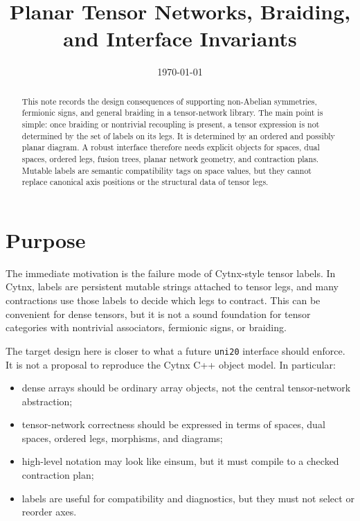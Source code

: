\documentclass[11pt]{article}
\title{Planar Tensor Networks, Braiding, and Interface Invariants}
\author{}
\date{\today}
\begin{document}
\maketitle

\begin{abstract}
This note records the design consequences of supporting non-Abelian
symmetries, fermionic signs, and general braiding in a tensor-network
library.  The main point is simple: once braiding or nontrivial
recoupling is present, a tensor expression is not determined by the
set of labels on its legs.  It is determined by an ordered and
possibly planar diagram.  A robust interface therefore needs explicit
objects for spaces, dual spaces, ordered legs, fusion trees, planar
network geometry, and contraction plans.  Mutable labels are semantic
compatibility tags on space values, but they cannot replace canonical
axis positions or the structural data of tensor legs.
\end{abstract}

\tableofcontents

\section{Purpose}

The immediate motivation is the failure mode of Cytnx-style tensor
labels.  In Cytnx, labels are persistent mutable strings attached to
tensor legs, and many contractions use those labels to decide which
legs to contract.  This can be convenient for dense tensors, but it is
not a sound foundation for tensor categories with nontrivial
associators, fermionic signs, or braiding.

The target design here is closer to what a future \texttt{uni20}
interface should enforce.  It is not a proposal to reproduce the
Cytnx C++ object model.  In particular:

\begin{itemize}[nosep]
  \item dense arrays should be ordinary array objects, not the central
        tensor-network abstraction;
  \item tensor-network correctness should be expressed in terms of
        spaces, dual spaces, ordered legs, morphisms, and diagrams;
  \item high-level notation may look like einsum, but it must compile
        to a checked contraction plan;
  \item labels are useful for compatibility and diagnostics, but they
        must not select or reorder axes.
\end{itemize}
\end{document}
